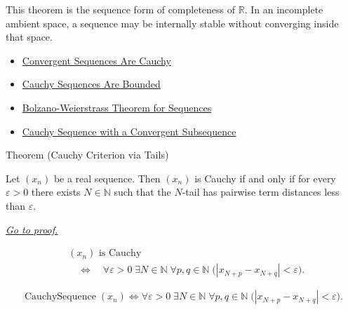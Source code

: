 \begin{remark*}[Interpretation]
This theorem is the sequence form of completeness of $\mathbb{R}$. In an
incomplete ambient space, a sequence may be internally stable without
converging inside that space.
\end{remark*}

\begin{dependencies}
\begin{itemize}
  \item \hyperref[thm:convergent-sequences-are-cauchy]{Convergent Sequences Are Cauchy}
  \item \hyperref[thm:cauchy-sequences-are-bounded]{Cauchy Sequences Are Bounded}
  \item \hyperref[thm:bolzano-weierstrass-sequences]{Bolzano-Weierstrass Theorem for Sequences}
  \item \hyperref[thm:cauchy-sequence-with-convergent-subsequence]{Cauchy Sequence with a Convergent Subsequence}
\end{itemize}
\end{dependencies}


\begin{theorembox}{Theorem (Cauchy Criterion via Tails)}
\begin{theorem}
\label{thm:cauchy-criterion-via-tails}
Let $(x_n)$ be a real sequence. Then $(x_n)$ is Cauchy if and only if
for every $\varepsilon>0$ there exists $N\in\mathbb{N}$ such that the
$N$-tail has pairwise term distances less than $\varepsilon$.

\smallskip
\noindent
\hyperref[prf:cauchy-criterion-via-tails]{\textit{Go to proof.}}
\end{theorem}
\end{theorembox}

\begin{remark*}
\[
\begin{aligned}
&(x_n)\text{ is Cauchy}\\
&\quad\Longleftrightarrow\quad
\forall \varepsilon>0\;\exists N\in\mathbb{N}\;\forall p,q\in\mathbb{N}
\;\bigl(|x_{N+p}-x_{N+q}|<\varepsilon\bigr).
\end{aligned}
\]
\end{remark*}

\begin{remark*}
\[
\operatorname{CauchySequence}(x_n)
\Longleftrightarrow
\forall \varepsilon>0\;\exists N\in\mathbb{N}\;\forall p,q\in\mathbb{N}
\;\bigl(|x_{N+p}-x_{N+q}|<\varepsilon\bigr).
\]
\end{remark*}

